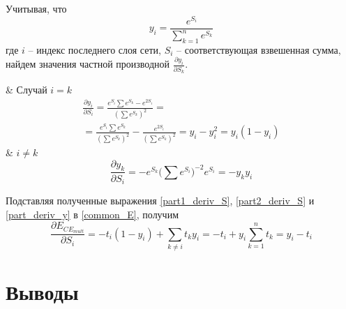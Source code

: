 Учитывая, что
\begin{equation}
	y_i = \frac{e^{S_i}}{\sum_{k=1}^{n} e^{S_k}}
\end{equation}
где $i$ -- индекс последнего слоя сети, $S_i$ -- соответствующая взвешенная сумма, найдем значения частной производной $\frac{\partial y_i}{\partial S_k}$.
\begin{easylistNum}
	& Случай $i = k$
	\begin{multline}
		\label{part1_deriv_S}
		\frac{\partial y_i}{\partial S_i} = \frac{e^{S_i}\sum e^{S_k} - e^{2S_i}}{(\sum e^{S_k})^2} = \\ = \frac{e^{S_i}\sum e^{S_k}}{(\sum e^{S_k})^2}-\frac{e^{2S_i}}{(\sum e^{S_k})^2}=y_i - y_i^2 = y_i(1-y_i)
	\end{multline}
	& $i \neq k$
	\begin{equation}
		\label{part2_deriv_S}
		\frac{\partial y_k}{\partial S_i} = -e^{S_k}\Big(\sum e^{S_i}\Big)^{-2}e^{S_i} = -y_ky_i
	\end{equation}
\end{easylistNum}

Подставляя полученные выражения \ref{part1_deriv_S}, \ref{part2_deriv_S} и \ref{part_deriv_y} в \ref{common_E}, получим
\begin{equation}
	\frac{\partial E_{CE_{mult}}}{\partial S_i} = -t_i(1-y_i) + \sum_{k\neq i}t_ky_i = -t_i + y_i\sum_{k=1}^{n}t_k = y_i - t_i
\end{equation}

\section{Выводы}

